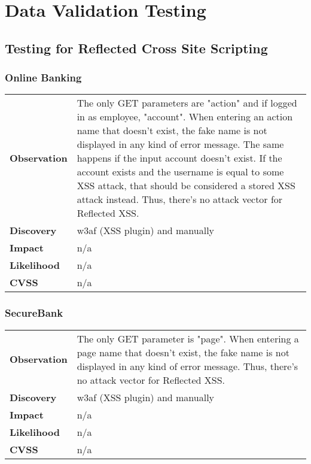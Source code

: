 \section{Data Validation Testing}

\subsection{Testing for Reflected Cross Site Scripting}

\subsubsection*{Online Banking}

\begin{tabular}{l|p{10cm}}
\textbf{Observation} & The only GET parameters are "action" and if logged in as employee, "account". When entering an action name that doesn't exist, the fake name is not displayed in any kind of error message. The same happens if the input account doesn't exist. If the account exists and the username is equal to some XSS attack, that should be considered a stored XSS attack instead. Thus, there's no attack vector for Reflected XSS. \\
\textbf{Discovery} & w3af (XSS plugin) and manually  \\
\textbf{Impact} & n/a \\
\textbf{Likelihood} & n/a \\
\textbf{CVSS} & n/a \\
\end{tabular}

\subsubsection*{SecureBank}

\begin{tabular}{l|p{10cm}}
\textbf{Observation} & The only GET parameter is "page". When entering a page name that doesn't exist, the fake name is not displayed in any kind of error message. Thus, there's no attack vector for Reflected XSS. \\
\textbf{Discovery} & w3af (XSS plugin) and manually \\
\textbf{Impact} & n/a \\
\textbf{Likelihood} & n/a \\
\textbf{CVSS} & n/a \\
\end{tabular}

